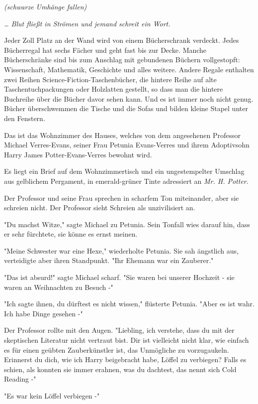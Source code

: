 {\emph{(schwarze Umhänge fallen)}

\emph{… Blut fließt in Strömen und jemand schreit ein Wort.}

\later

Jeder Zoll Platz an der Wand wird von einem Bücherschrank verdeckt. Jedes Bücherregal hat sechs Fächer und geht fast bis zur Decke. Manche Bücherschränke sind bis zum Anschlag mit gebundenen Büchern vollgestopft: Wissenschaft, Mathematik, Geschichte und alles weitere. Andere Regale enthalten zwei Reihen Science-Fiction-Taschenbücher, die hintere Reihe auf alte Taschentuchpackungen oder Holzlatten gestellt, so dass man die hintere Buchreihe über die Bücher davor sehen kann. Und es ist immer noch nicht genug. Bücher überschwemmen die Tische und die Sofas und bilden kleine Stapel unter den Fenstern.

Das ist das Wohnzimmer des Hauses, welches von dem angesehenen Professor Michael Verres-Evans, seiner Frau Petunia Evans-Verres und ihrem Adoptivsohn Harry James Potter-Evans-Verres bewohnt wird.

Es liegt ein Brief auf dem Wohnzimmertisch und ein ungestempelter Umschlag aus gelblichem Pergament, in emerald-grüner Tinte adressiert an \emph{Mr. H. Potter}.

Der Professor und seine Frau sprechen in scharfem Ton miteinander, aber sie schreien nicht. Der Professor sieht Schreien als unzivilisiert an.

"Du machst Witze," sagte Michael zu Petunia. Sein Tonfall wies darauf hin, dass er sehr fürchtete, sie könne es ernst meinen.

"Meine Schwester war eine Hexe," wiederholte Petunia. Sie sah ängstlich aus, verteidigte aber ihren Standpunkt. "Ihr Ehemann war ein Zauberer."

"Das ist absurd!" sagte Michael scharf. "Sie waren bei unserer Hochzeit - sie waren an Weihnachten zu Besuch -"

"Ich sagte ihnen, du dürftest es nicht wissen," flüsterte Petunia. "Aber es ist wahr. Ich habe Dinge gesehen -"

Der Professor rollte mit den Augen. "Liebling, ich verstehe, dass du mit der skeptischen Literatur nicht vertraut bist. Dir ist vielleicht nicht klar, wie einfach es für einen geübten Zauberkünstler ist, das Unmögliche zu vorzugaukeln. Erinnerst du dich, wie ich Harry beigebracht habe, Löffel zu verbiegen? Falls es schien, als konnten sie immer erahnen, was du dachtest, das nennt sich Cold Reading -"

"Es war kein Löffel verbiegen -"

}
